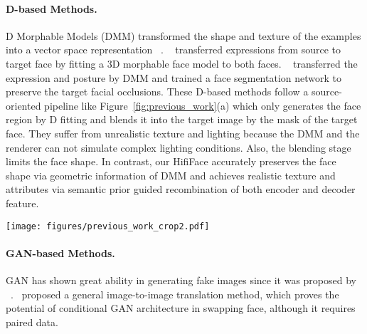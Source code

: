 \documentclass{article}
\begin{document}
\paragraph{D-based Methods.} 
D Morphable Models (DMM) transformed the shape and texture of the examples into a vector space representation ~\cite{blanz1999morphable}.   
~\cite{thies2016face2face} transferred expressions from source to target face by fitting a 3D morphable face model to both faces. 
 ~\cite{nirkin2018face} transferred the expression and posture by DMM and trained a face segmentation network to preserve the target facial occlusions. 
These D-based methods follow a source-oriented pipeline like Figure~\ref{fig:previous_work}(a) which only generates the face region by D fitting and blends it into the target image by the mask of the target face. They suffer from unrealistic texture and lighting because the DMM and the renderer can not simulate complex lighting conditions. Also, the blending stage limits the face shape. In contrast, our HifiFace accurately preserves the face shape via geometric information of DMM and achieves realistic texture and attributes via semantic prior guided recombination of both encoder and decoder feature.
\begin{figure*}[t] 
\begin{center} 
\texttt{[image: figures/previous\_work\_crop2.pdf]} 
\end{center} 
\vspace{-2mm}
\caption{The pipelines of previous works and our HifiFace. 
(a) Source-oriented pipeline uses D fitting or reenactment to generate inner face region and blend it into the target image, in which  means the face region of the result. 
(b) Target-oriented pipeline uses a face recognition network to exact identity and combines encoder feature with identity in the decoder. 
(c) Our pipeline consists of four parts: the Encoder part, Decoder part, D shape-aware identity extractor, and SFF module. 
The encoder extracts features from , and the decoder fuses the encoder feature and the D shape-aware identity feature. Finally, the SFF module helps further improve the image quality.} 
\label{fig:previous_work} 
\end{figure*}


\paragraph{GAN-based Methods.}
GAN has shown great ability in generating fake images since it was proposed by ~\cite{goodfellow2014generative}.~\cite{isola2017image} proposed a general image-to-image translation method, which proves the potential of conditional GAN architecture in swapping face, although it requires paired data. 
\end{document}
